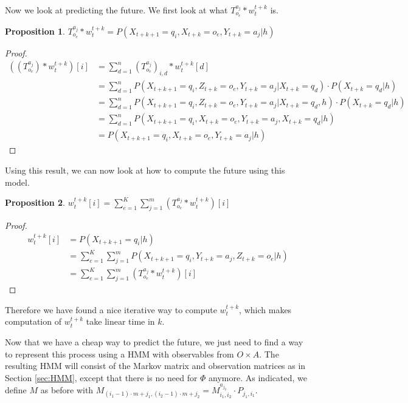 \documentclass{article}
\newtheorem{prop}{Proposition}
\theoremstyle{definition}
\begin{document}
Now we look at predicting the future.
We first look at what $T^{a_j}_{o_e}*w_t^{t+k}$ is. 
\begin{prop}
$T^{a_j}_{o_e}*w_t^{t+k}=P(X_{t+k+1}=q_i,X_{t+k}=o_e,Y_{t+k}=a_j|h)$
\end{prop}
\begin{proof}
\begin{align*}
((T^{a_j}_{o_e})*w_t^{t+k})[i]&=\sum\limits_{d=1}^{n} (T^{a_j}_{o_e})_{i,d}*w_t^{t+k}[d] \\
&=\sum\limits_{d=1}^n P(X_{t+k+1}=q_i,Z_{t+k}=o_e,Y_{t+k}=a_j|X_{t+k}=q_d)\cdot P(X_{t+k}=q_d|h) \\
&=\sum\limits_{d=1}^n P(X_{t+k+1}=q_i,Z_{t+k}=o_e,Y_{t+k}=a_j|X_{t+k}=q_d,h)\cdot P(X_{t+k}=q_d|h) \\
&=\sum\limits_{d=1}^{n} P(X_{t+k+1}=q_i,X_{t+k}=o_e,Y_{t+k}=a_j,X_{t+k}=q_d|h) \\
&=P(X_{t+k+1}=q_i,X_{t+k}=o_e,Y_{t+k}=a_j|h)
\end{align*}
\end{proof}
Using this result, we can now look at how to compute the future using this model. 
\begin{prop}
$w_t^{t+k}[i]=\sum\limits_{e=1}^{K} \sum\limits_{j=1}^{m} (T^{a_j}_{o_e}*w_t^{t+k})[i]$
\end{prop}
\begin{proof}
\begin{align*}
w_t^{t+k}[i]&=P(X_{t+k+1}=q_i|h) \\
&=\sum\limits_{e=1}^{K} \sum\limits_{j=1}^{m} P(X_{t+k+1}=q_i,Y_{t+k}=a_j,Z_{t+k}=o_e|h) \\
&=\sum\limits_{e=1}^{K} \sum\limits_{j=1}^{m} (T^{a_j}_{o_e}*w_t^{t+k})[i]
\end{align*}
\end{proof}
Therefore we have found a nice iterative way to compute $w_t^{t+k}$, which makes computation of $w_t^{t+k}$ take linear time in $k$.

Now that we have a cheap way to predict the future, we just need to find a way to represent this process using  a HMM with observables from $O\times A$. The resulting HMM will consist of the Markov matrix and observation matrices as in Section \ref{sec:HMM}, except that there is no need for $\Phi$ anymore.
As indicated, we define $M$ as before with $M_{(i_1-1)\cdot m+j_1,(i_2-1)\cdot m+j_2}=M^{a_{j_2}}_{i_1,i_2}\cdot P_{j_1,i_1}$. 
\end{document}

